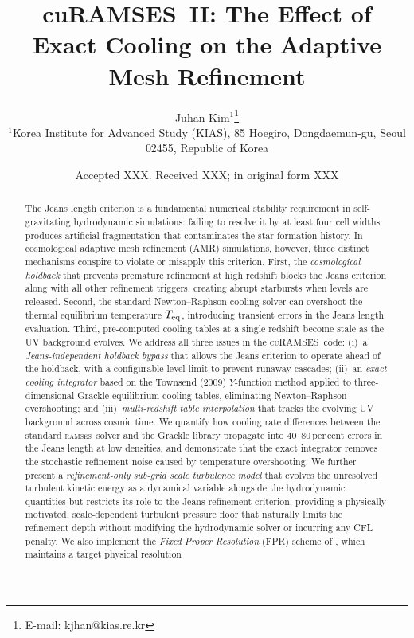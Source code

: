 \documentclass[fleqn,usenatbib]{mnras}
\title[cuRAMSES~II: The Effect of Exact Cooling on the Adaptive Mesh Refinement]
{cuRAMSES~II: The Effect of Exact Cooling on the Adaptive Mesh Refinement}
\author[J. Kim]{Juhan Kim$^{1}$\thanks{E-mail: kjhan@kias.re.kr}
\\
$^{1}$Korea Institute for Advanced Study (KIAS),
85 Hoegiro, Dongdaemun-gu, Seoul 02455, Republic of Korea}
\date{Accepted XXX. Received XXX; in original form XXX}
\newcommand{\ramses}{\textsc{ramses}}
\newcommand{\curamses}{\textsc{cuRAMSES}}
\begin{document}
\label{firstpage}
\pagerange{\pageref{firstpage}--\pageref{lastpage}}
\maketitle

\begin{abstract}
The Jeans length criterion is a fundamental numerical stability
requirement in self-gravitating hydrodynamic simulations: failing to
resolve it by at least four cell widths produces artificial
fragmentation that contaminates the star formation history.  In
cosmological adaptive mesh refinement (AMR) simulations, however,
three distinct mechanisms conspire to violate or misapply this
criterion.  First, the \emph{cosmological holdback} that prevents
premature refinement at high redshift blocks the Jeans criterion
along with all other refinement triggers, creating abrupt starbursts
when levels are released.  Second, the standard Newton--Raphson
cooling solver can overshoot the thermal equilibrium temperature
$T_{\rm eq}$, introducing transient errors in the Jeans length
evaluation.  Third, pre-computed cooling tables at a single redshift
become stale as the UV background evolves.  We address all three
issues in the \curamses\ code: (i)~a \emph{Jeans-independent
holdback bypass} that allows the Jeans criterion to operate ahead of
the holdback, with a configurable level limit to prevent runaway
cascades; (ii)~an \emph{exact cooling integrator} based on the
Townsend (2009) $Y$-function method applied to three-dimensional
Grackle equilibrium cooling tables, eliminating Newton--Raphson
overshooting; and (iii)~\emph{multi-redshift table interpolation}
that tracks the evolving UV background across cosmic time.  We
quantify how cooling rate differences between the standard
\ramses\ solver and the Grackle library propagate into
40--80\,per\,cent errors in the Jeans length at low densities,
and demonstrate that the exact integrator removes the stochastic
refinement noise caused by temperature overshooting.
We further present a \emph{refinement-only sub-grid scale turbulence
model} that evolves the unresolved turbulent kinetic energy as a
dynamical variable alongside the hydrodynamic quantities but restricts
its role to the Jeans refinement criterion, providing a physically
motivated, scale-dependent turbulent pressure floor that naturally
limits the refinement depth without modifying the hydrodynamic solver
or incurring any CFL penalty.
We also implement the \emph{Fixed Proper Resolution} (FPR) scheme of
\citet{Gnedin2016}, which maintains a target physical resolution

\end{abstract}
\end{document}
